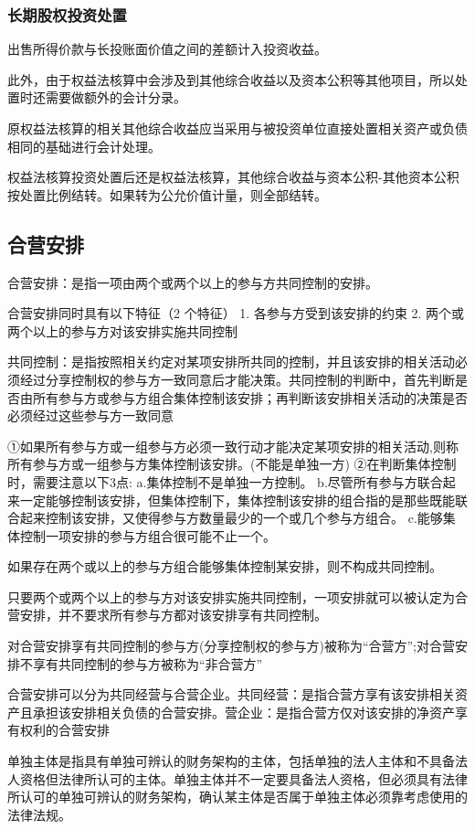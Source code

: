 \documentclass[UTF8,12pt]{ctexart}
\numberwithin{equation}{section} %
\numberwithin{figure}{section}
\numberwithin{table}{section}
\begin{document}
	\subsubsection{长期股权投资处置}
	出售所得价款与长投账面价值之间的差额计入投资收益。
	
	此外，由于权益法核算中会涉及到其他综合收益以及资本公积等其他项目，所以处置时还需要做额外的会计分录。
	
	原权益法核算的相关其他综合收益应当采用与被投资单位直接处置相关资产或负债相同的基础进行会计处理。
	
	权益法核算投资处置后还是权益法核算，其他综合收益与资本公积-其他资本公积按处置比例结转。如果转为公允价值计量，则全部结转。
	
	
	
	\subsection{合营安排}
	合营安排：是指一项由两个或两个以上的参与方共同控制的安排。
	
	合营安排同时具有以下特征（2 个特征）
	1.	各参与方受到该安排的约束
	2.	两个或两个以上的参与方对该安排实施共同控制
	
	共同控制：是指按照相关约定对某项安排所共同的控制，并且该安排的相关活动必须经过分享控制权的参与方一致同意后才能决策。共同控制的判断中，首先判断是否由所有参与方或参与方组合集体控制该安排；再判断该安排相关活动的决策是否必须经过这些参与方一致同意
	
	①如果所有参与方或一组参与方必须一致行动才能决定某项安排的相关活动,则称所有参与方或一组参与方集体控制该安排。(不能是单独一方)
	②在判断集体控制时，需要注意以下3点:
	a.集体控制不是单独一方控制。
	b.尽管所有参与方联合起来一定能够控制该安排，但集体控制下，集体控制该安排的组合指的是那些既能联合起来控制该安排，又使得参与方数量最少的一个或几个参与方组合。
	c.能够集体控制一项安排的参与方组合很可能不止一个。
	
	如果存在两个或以上的参与方组合能够集体控制某安排，则不构成共同控制。
	
	只要两个或两个以上的参与方对该安排实施共同控制，一项安排就可以被认定为合营安排，并不要求所有参与方都对该安排享有共同控制。
	
	对合营安排享有共同控制的参与方(分享控制权的参与方)被称为“合营方”;对合营安排不享有共同控制的参与方被称为“非合营方”
	
	合营安排可以分为共同经营与合营企业。共同经营：是指合营方享有该安排相关资产且承担该安排相关负债的合营安排。营企业：是指合营方仅对该安排的净资产享有权利的合营安排
	
	单独主体是指具有单独可辨认的财务架构的主体，包括单独的法人主体和不具备法人资格但法律所认可的主体。单独主体并不一定要具备法人资格，但必须具有法律所认可的单独可辨认的财务架构，确认某主体是否属于单独主体必须靠考虑使用的法律法规。
	
\end{document}
